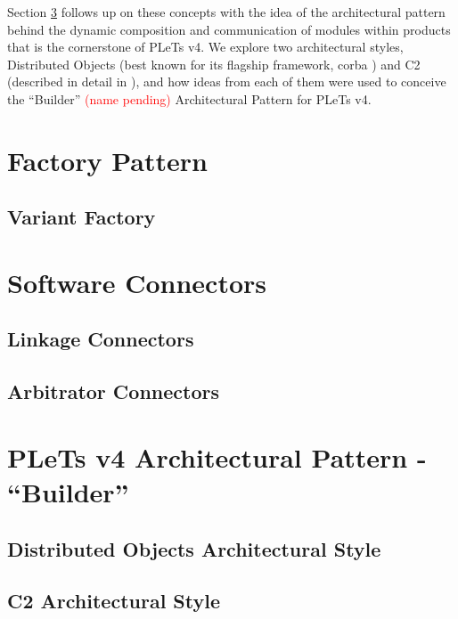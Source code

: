 Section \ref{sc:builder} follows up on these concepts with the idea of the architectural pattern behind the dynamic composition and communication of modules within products that is the cornerstone of PLeTs v4. We explore two architectural styles, Distributed Objects (best known for its flagship framework, \acrshort{corba} \cite{CORBA:2012}) and C2 (described in detail in \cite{TAYLOR:2009}), and how ideas from each of them were used to conceive the ``Builder'' \textcolor{red}{(name pending)} Architectural Pattern for PLeTs v4.


\section{Factory Pattern}
\label{sc:factory}


\subsection{Variant Factory}


\section{Software Connectors}
\label{sc:connectors}


\subsection{Linkage Connectors}


\subsection{Arbitrator Connectors}


\section{PLeTs v4 Architectural Pattern - ``Builder''}
\label{sc:builder}


\subsection{Distributed Objects Architectural Style}


\subsection{C2 Architectural Style}

